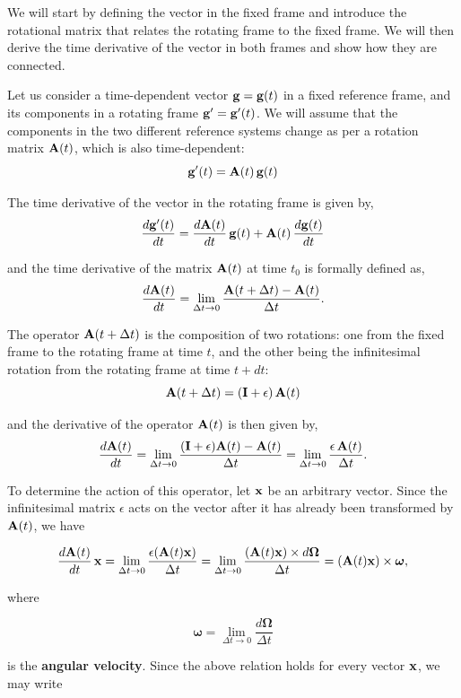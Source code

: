 \documentclass[12pt]{article}
\begin{document}
We will start by defining the vector in the fixed frame and introduce the rotational matrix
that relates the rotating frame to the fixed frame. We will then derive the time derivative
of the vector in both frames and show how they are connected.

Let us consider a time-dependent vector $\vb{g} = \vb{g}(t)$ in a fixed reference frame,
and its components in a rotating frame $\vb{g}' = \vb{g}'(t)$. We will assume that the
components in the two different reference systems change as per a rotation matrix $\vb{A}(t)$,
which is also time-dependent:
\[
  \vb{g}'(t) = \vb{A}(t)\,\vb{g}(t)
\]

The time derivative of the vector in the rotating frame is given by,
\[
  \frac{d\vb{g}'(t)}{dt} = \frac{d\vb{A}(t)}{dt}\,\vb{g}(t) + \vb{A}(t)\,\frac{d\vb{g}(t)}{dt}
\]

and the time derivative of the matrix $\vb{A}(t)$ at time $t_0$ is formally defined as,
\[
  \frac{d\vb{A}(t)}{dt} = \lim_{\Delta t \to 0}\frac{\vb{A}(t+\Delta t) - \vb{A}(t)}{\Delta t}.
\]

The operator $\vb{A}(t+\Delta t)$ is the composition of two rotations: one from the fixed
frame to the rotating frame at time $t$, and the other being the infinitesimal rotation from
the rotating frame at time $t + dt$:
\[
  \vb{A}(t+\Delta t) = (\vb{I} + \epsilon)\,\vb{A}(t)
\]

and the derivative of the operator $\vb{A}(t)$ is then given by,
\[
  \frac{d\vb{A}(t)}{dt}
  = \lim_{\Delta t\to 0}
    \frac{(\vb{I}+\epsilon)\vb{A}(t)-\vb{A}(t)}{\Delta t}
  = \lim_{\Delta t\to 0}
    \frac{\epsilon\,\vb{A}(t)}{\Delta t}.
\]

To determine the action of this operator, let $\vb{x}$ be an arbitrary vector.
Since the infinitesimal matrix $\epsilon$ acts on the vector after it has already
been transformed by $\vb{A}(t)$, we have

\[
  \frac{d\vb{A}(t)}{dt}\,\vb{x}
  =
  \lim_{\Delta t\to 0}
  \frac{\epsilon\!\left(\vb{A}(t)\vb{x}\right)}{\Delta t}
  =
  \lim_{\Delta t\to 0}
  \frac{\left(\vb{A}(t)\vb{x}\right)\times d\boldsymbol{\Omega}}{\Delta t}
  =
  \left(\vb{A}(t)\vb{x}\right)\times\boldsymbol{\omega},
\]

where

\[
  \boldsymbol{\omega}
  =
  \lim_{\Delta t\to 0}
  \frac{d\boldsymbol{\Omega}}{\Delta t}
\]

is the \textbf{angular velocity}. Since the above relation holds for every vector
$\vb{x}$, we may write
\end{document}
